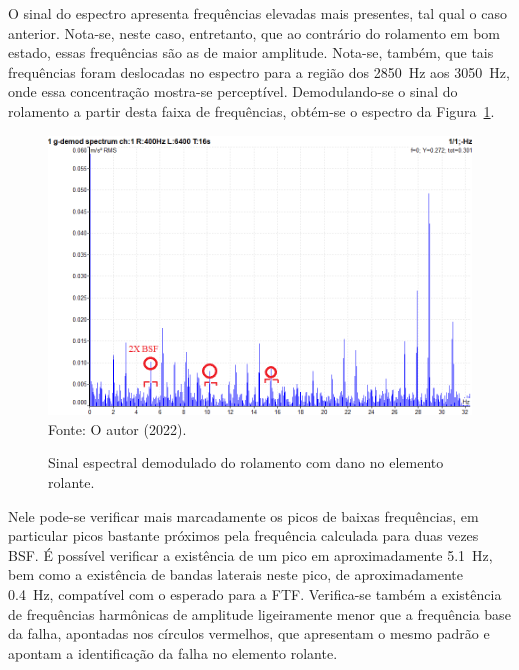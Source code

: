 \documentclass[
	12pt,				
	oneside,			
	a4paper,			
	english,			
	brazil,			
	]{abntex2ppgsi}
\begin{document}
O sinal do espectro apresenta frequências elevadas mais presentes, tal qual o caso anterior. Nota-se, neste caso, entretanto, que ao contrário do rolamento em bom estado, essas frequências são as de maior amplitude. Nota-se, também, que tais frequências foram deslocadas no espectro para a região dos \SI{2850}{\hertz} aos \SI{3050}{\hertz}, onde essa concentração mostra-se perceptível. Demodulando-se o sinal do rolamento a partir desta faixa de frequências, obtém-se o espectro da Figura~\ref{2bsf_anotado}. 

\begin{figure}[H]
\centering
\caption {Sinal espectral demodulado do rolamento com dano no elemento rolante.}
\includegraphics[width=\textwidth,keepaspectratio]{2bsf_anotado} \\
Fonte: O autor (2022).
\label{2bsf_anotado}
\end{figure}

Nele pode-se verificar mais marcadamente os picos de baixas frequências, em particular picos bastante próximos pela frequência calculada para duas vezes BSF. É possível verificar a existência de um pico em aproximadamente \SI{5,1}{\hertz}, bem como a existência de bandas laterais neste pico, de aproximadamente \SI{0,4}{\hertz}, compatível com o esperado para a FTF. Verifica-se também a existência de frequências harmônicas de amplitude ligeiramente menor que a frequência base da falha, apontadas nos círculos vermelhos, que apresentam o mesmo padrão e apontam a identificação da falha no elemento rolante.

\subsection{}
\end{document}
